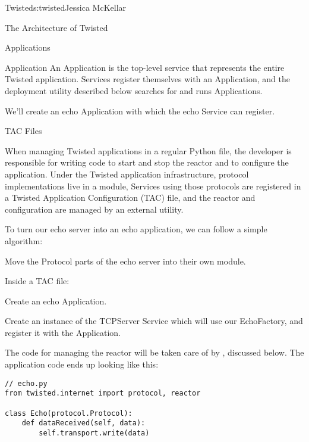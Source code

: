 \begin{aosachapter}{Twisted}{s:twisted}{Jessica McKellar}
\begin{aosasect1}{The Architecture of Twisted}
\begin{aosasect2}{Applications}
\begin{aosasect3}{Application}
An Application is the top-level service that represents the entire Twisted
application. Services register themselves with an Application, and the 
deployment utility described below searches for and runs Applications.

We'll create an echo Application with which the echo Service can
register.

\end{aosasect3}

\begin{aosasect3}{TAC Files}

When managing Twisted applications in a regular Python file, the developer is
responsible for writing code to start and stop the reactor and to configure the
application. Under the Twisted application infrastructure, protocol
implementations live in a module, Services using those protocols are registered
in a Twisted Application Configuration (TAC) file, and the reactor and
configuration are managed by an external utility.

To turn our echo server into an echo application, we can follow a simple
algorithm:

\begin{aosaenumerate}

\item Move the Protocol parts of the echo server into their own
  module.

\item Inside a TAC file:

    \begin{aosaenumerate2}
    
\item Create an echo Application.

    
\item Create an instance of the TCPServer Service which will use our
  EchoFactory, and register it with the Application.
    
\end{aosaenumerate2}

\end{aosaenumerate}

The code for managing the reactor will be taken care of by
, discussed below. The application code ends up looking like
this:

\begin{verbatim}
// echo.py
from twisted.internet import protocol, reactor

class Echo(protocol.Protocol):
    def dataReceived(self, data):
        self.transport.write(data)


\end{verbatim}
\end{aosasect3}
\end{aosasect2}
\end{aosasect1}
\end{aosachapter}
